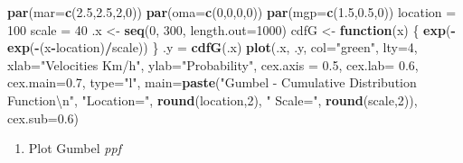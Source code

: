 \documentclass[12pt,oneside]{reedthesis}
\newenvironment{Shaded}{\begin{snugshade}}{\end{snugshade}}
\newcommand{\CharTok}[1]{\textcolor[rgb]{0.31,0.60,0.02}{#1}}
\newcommand{\ControlFlowTok}[1]{\textcolor[rgb]{0.13,0.29,0.53}{\textbf{#1}}}
\newcommand{\DataTypeTok}[1]{\textcolor[rgb]{0.13,0.29,0.53}{#1}}
\newcommand{\DecValTok}[1]{\textcolor[rgb]{0.00,0.00,0.81}{#1}}
\newcommand{\FloatTok}[1]{\textcolor[rgb]{0.00,0.00,0.81}{#1}}
\newcommand{\KeywordTok}[1]{\textcolor[rgb]{0.13,0.29,0.53}{\textbf{#1}}}
\newcommand{\NormalTok}[1]{#1}
\newcommand{\OperatorTok}[1]{\textcolor[rgb]{0.81,0.36,0.00}{\textbf{#1}}}
\newcommand{\StringTok}[1]{\textcolor[rgb]{0.31,0.60,0.02}{#1}}
\providecommand{\tightlist}{%
  \setlength{\itemsep}{0pt}\setlength{\parskip}{0pt}}
\begin{document}
\vspace{0.4cm}
\begin{Shaded}
\begin{Highlighting}[]
\KeywordTok{par}\NormalTok{(}\DataTypeTok{mar=}\KeywordTok{c}\NormalTok{(}\FloatTok{2.5}\NormalTok{,}\FloatTok{2.5}\NormalTok{,}\DecValTok{2}\NormalTok{,}\DecValTok{0}\NormalTok{))}
\KeywordTok{par}\NormalTok{(}\DataTypeTok{oma=}\KeywordTok{c}\NormalTok{(}\DecValTok{0}\NormalTok{,}\DecValTok{0}\NormalTok{,}\DecValTok{0}\NormalTok{,}\DecValTok{0}\NormalTok{))}
\KeywordTok{par}\NormalTok{(}\DataTypeTok{mgp=}\KeywordTok{c}\NormalTok{(}\FloatTok{1.5}\NormalTok{,}\FloatTok{0.5}\NormalTok{,}\DecValTok{0}\NormalTok{))}
\NormalTok{location =}\StringTok{ }\DecValTok{100}
\NormalTok{scale =}\StringTok{ }\DecValTok{40}
\NormalTok{.x <-}\StringTok{ }\KeywordTok{seq}\NormalTok{(}\DecValTok{0}\NormalTok{, }\DecValTok{300}\NormalTok{, }\DataTypeTok{length.out=}\DecValTok{1000}\NormalTok{)}
\NormalTok{cdfG <-}\StringTok{ }\ControlFlowTok{function}\NormalTok{(x) \{}
  \KeywordTok{exp}\NormalTok{(}\OperatorTok{-}\KeywordTok{exp}\NormalTok{(}\OperatorTok{-}\NormalTok{(x}\OperatorTok{-}\NormalTok{location)}\OperatorTok{/}\NormalTok{scale))}
\NormalTok{  \}}
\NormalTok{.y =}\StringTok{ }\KeywordTok{cdfG}\NormalTok{(.x)}
\KeywordTok{plot}\NormalTok{(.x, .y, }\DataTypeTok{col=}\StringTok{"green"}\NormalTok{, }\DataTypeTok{lty=}\DecValTok{4}\NormalTok{, }\DataTypeTok{xlab=}\StringTok{"Velocities Km/h"}\NormalTok{, }\DataTypeTok{ylab=}\StringTok{"Probability"}\NormalTok{, }\DataTypeTok{cex.axis =} \FloatTok{0.5}\NormalTok{, }\DataTypeTok{cex.lab=} \FloatTok{0.6}\NormalTok{, }\DataTypeTok{cex.main=}\FloatTok{0.7}\NormalTok{, }\DataTypeTok{type=}\StringTok{"l"}\NormalTok{,}
 \DataTypeTok{main=}\KeywordTok{paste}\NormalTok{(}\StringTok{"Gumbel - Cumulative Distribution Function}\CharTok{\textbackslash{}n}\StringTok{"}\NormalTok{, }\StringTok{"Location="}\NormalTok{, }\KeywordTok{round}\NormalTok{(location,}\DecValTok{2}\NormalTok{), }\StringTok{" Scale="}\NormalTok{, }\KeywordTok{round}\NormalTok{(scale,}\DecValTok{2}\NormalTok{)), }\DataTypeTok{cex.sub=}\FloatTok{0.6}\NormalTok{)}
\end{Highlighting}
\end{Shaded}
\normalsize
\begin{enumerate}
\def\labelenumi{\arabic{enumi}.}
\setcounter{enumi}{3}
\tightlist
\item
  Plot Gumbel \emph{ppf}
\end{enumerate}
\tiny
\end{document}
